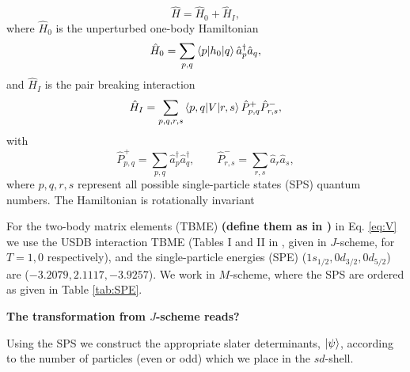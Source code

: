 \documentclass[aps,prl,reprint,groupedaddress]{revtex4-1}  %
\begin{document}
		\begin{equation} \label{eq:H}
		\hat H = \hat H_0 + \hat H_I,
		\end{equation}
		where $\hat H_0$ is the unperturbed one-body Hamiltonian
		\begin{equation} \label{eq:H_0}
		\hat H_0 = \sum_{p,q} \braket{p|h_0|q} \hat a_{p}^\dagger \hat a_{q},
		\end{equation}
		and $\hat H_I$ is the pair breaking interaction
		\begin{equation} \label{eq:V}
		\hat H_I = \sum_{p,q,r,s} \braket{p,q|V|r,s}\hat P_{p,q}^+ \hat P_{r,s}^- ,
		\end{equation}
		with
		\begin{equation} \label{eq:P}
		\hat P_{p,q}^+ = \sum_{p,q} \hat a_p^\dagger \hat a_q^\dagger, \qquad
		\hat P_{r,s}^- = \sum_{r,s} \hat a_r \hat a_s,
		\end{equation} 
where $p,q,r,s$  represent all possible single-particle states (SPS) quantum numbers. The Hamiltonian is rotationally invariant 

For the two-body matrix elements (TBME) \textbf{(define them as in \cite{Brown2006})} in Eq. \eqref{eq:V} we use the USDB interaction TBME \cite{Brown2006} (Tables I and II in \cite{Brown2006}, given in $J$-scheme, for $T=1,0$ respectively), and the single-particle energies (SPE) ($1s_{1/2},0d_{3/2},0d_{5/2}$) are ($-3.2079, 2.1117, -3.9257$). 
We work in $M$-scheme, where the SPS are ordered as given in Table \ref{tab:SPE}. 

\textbf{The transformation from $J$-scheme reads?}

Using the SPS we construct the appropriate slater determinants, $\ket{\psi}$, according to the number of particles (even or odd)  which we place in the $sd$-shell.
\end{document}
